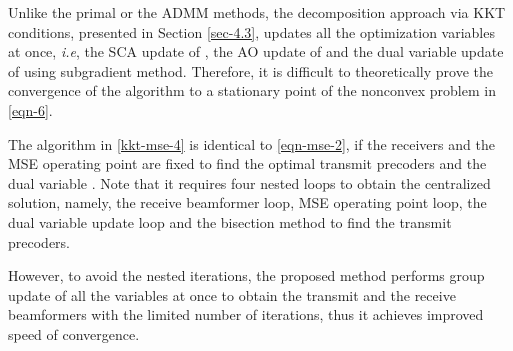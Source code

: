 Unlike the primal or the \ac{ADMM} methods, the decomposition approach via \ac{KKT} conditions, presented in Section \ref{sec-4.3}, updates all the optimization variables at once, \textit{i.e}, the \ac{SCA} update of , the \ac{AO} update of  and the dual variable update of \me{\alpha} using subgradient method. Therefore, it is difficult to theoretically prove the convergence of the algorithm to a stationary point of the nonconvex problem in \eqref{eqn-6}.

The algorithm in \eqref{kkt-mse-4} is identical to \eqref{eqn-mse-2}, if the receivers  and the \ac{MSE} operating point  are fixed to find the optimal transmit precoders  and the dual variable . Note that it requires four nested loops to obtain the centralized solution, namely, the receive beamformer loop, \ac{MSE} operating point loop, the dual variable update loop and the bisection method to find the transmit precoders. 

However, to avoid the nested iterations, the proposed method performs group update of all the variables at once to obtain the transmit and the receive beamformers with the limited number of iterations, thus it achieves improved speed of convergence.  

